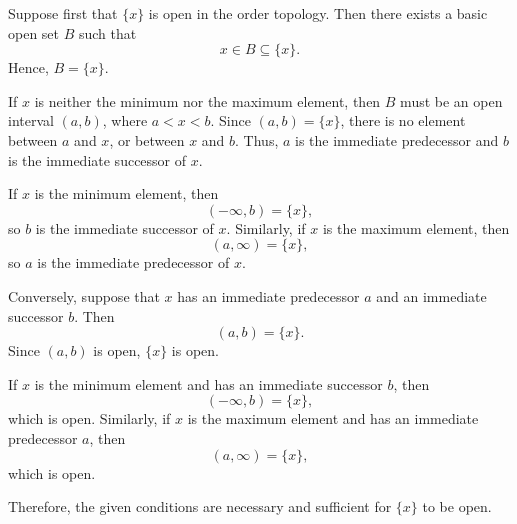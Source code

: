 
Suppose first that $\{x\}$ is open in the order topology. Then there exists a basic open set
$B$ such that
\[
  x\in B\subseteq\{x\}.
\]
Hence, $B=\{x\}$.

If $x$ is neither the minimum nor the maximum element, then $B$ must be an open interval
$(a,b)$, where $a<x<b$. Since $(a,b)=\{x\}$, there is no element between $a$ and $x$, or
between $x$ and $b$. Thus, $a$ is the immediate predecessor and $b$ is the immediate
successor of $x$.

If $x$ is the minimum element, then
\[
  (-\infty,b)=\{x\},
\]
so $b$ is the immediate successor of $x$. Similarly, if $x$ is the maximum element, then
\[
  (a,\infty)=\{x\},
\]
so $a$ is the immediate predecessor of $x$.

Conversely, suppose that $x$ has an immediate predecessor $a$ and an immediate successor $b$.
Then
\[
  (a,b)=\{x\}.
\]
Since $(a,b)$ is open, $\{x\}$ is open.

If $x$ is the minimum element and has an immediate successor $b$, then
\[
  (-\infty,b)=\{x\},
\]
which is open. Similarly, if $x$ is the maximum element and has an immediate predecessor $a$,
then
\[
  (a,\infty)=\{x\},
\]
which is open.

Therefore, the given conditions are necessary and sufficient for $\{x\}$ to be open.
